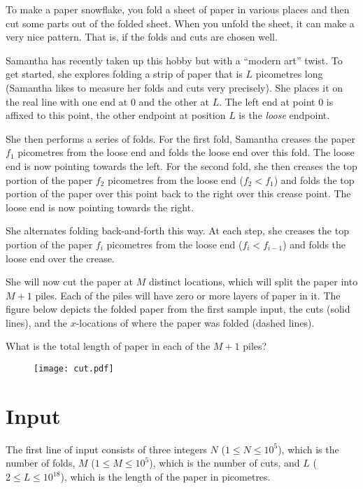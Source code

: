
To make a paper snowflake, you fold a sheet of paper in various places
and then cut some parts out of the folded sheet. When you unfold the sheet,
it can make a very nice pattern. That is, if the folds and cuts are chosen well.

Samantha has recently taken up this hobby but with a ``modern art'' twist.
To get started, she explores folding a strip of paper that is $L$ picometres long (Samantha likes to measure her folds and cuts very precisely).
She places it on the real line with one end at $0$ and the other at $L$. The
left end at point $0$ is affixed to this point, the other endpoint at position $L$
is the {\em loose} endpoint.

She then performs a series of folds. For the first fold, Samantha creases the paper
$f_1$ picometres from the loose end and folds the loose end over this fold.
The loose end is now pointing towards the left.
For the second fold, she then creases the top portion of the paper $f_2$ picometres
from the loose end ($f_2 < f_1$) and folds the top portion of the paper over this point
back to the right over this crease point. The loose end is now pointing towards the right.

She alternates folding back-and-forth this way. At each step, she creases the top portion of the paper $f_i$ picometres from the loose end ($f_i < f_{i-1}$) and folds the loose end over the crease.

She will now cut the paper at $M$ distinct locations, which will split the paper into $M+1$ piles. Each of the piles will have zero or more layers of paper in it. The figure below depicts the folded paper from the first sample input, the cuts (solid lines), and the $x$-locations of where the paper was folded (dashed lines).

What is the total length of paper in each of the $M+1$ piles?

\begin{figure}[h]
\begin{center}
 \texttt{[image: cut.pdf]}
\end{center}
\end{figure}

\section*{Input}
The first line of input consists of three integers $N$ ($1 \leq N \leq 10^5$),
which is the number of folds, $M$ ($1 \leq M \leq 10^5$), which is the number
of cuts, and $L$ ($2 \leq L \leq 10^{18}$), which is the length of the paper
in picometres.

